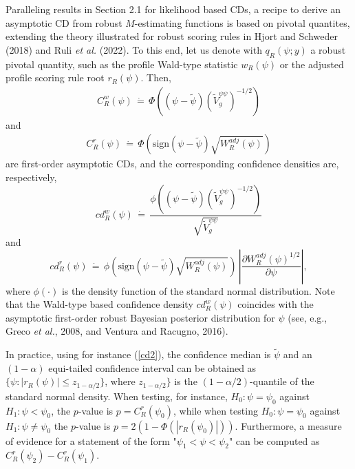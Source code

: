 \documentclass[preprint,12pt,authoryear]{elsarticle}
\begin{document}
Paralleling results in Section 2.1 for likelihood based CDs, a recipe to derive an asymptotic CD from robust $M$-estimating functions is based on pivotal quantites, extending the theory illustrated for robust scoring rules in Hjort and Schweder (2018) and Ruli {\em et al.} (2022). To this end, let us denote with $q_R (\psi;y)$ a robust pivotal quantity, such as the profile Wald-type statistic $w_{R}  (\psi)$ or the adjusted profile scoring rule root $r_{R} (\psi)$. Then, 
\begin{eqnarray}
C_{R}^w(\psi) \, \dot{=} \, \Phi\left( (\psi - \tilde\psi) (\tilde{V}_g^{\psi \psi})^{-1/2} \right)
\label{cd1}
\end{eqnarray}
and
\begin{eqnarray}
C_{R}^r(\psi) \, \dot{=} \, \Phi \left( \text{sign} (\psi - \tilde\psi) \sqrt{ W_{R}^{adj} (\psi) } \right)
\label{cd2}
\end{eqnarray}
are first-order asymptotic CDs, and the corresponding confidence densities are, respectively,
$$
cd_{R}^w(\psi) \, \dot{=} \, \frac{\phi \left((\psi - \tilde\psi) (\tilde{V}_g^{\psi \psi})^{-1/2} \right)}{\sqrt{\tilde{V}_g^{\psi \psi}}}
$$
and
$$
cd_{R}^r(\psi)  \, \dot{=} \,  \phi \left( \text{sign} (\psi - \tilde\psi) \sqrt{ W_{R}^{adj} (\psi) } \right) \,  \left| \frac{\partial W_{R}^{adj} (\psi)^{1/2}}{\partial \psi} \right|,
$$
where $\phi(\cdot)$ is the density function of the standard normal distribution. Note that the Wald-type based confidence density $cd_{R}^w(\psi) $ coincides with the asymptotic first-order robust Bayesian posterior distribution for $\psi$ (see, e.g., Greco {\em et al.}, 2008, and Ventura and Racugno, 2016).

In practice, using for instance (\ref{cd2}), the confidence median is $\tilde\psi$ and an $(1-\alpha)$ equi-tailed confidence interval can be obtained as $\{\psi : |r_{R} (\psi)| \leq z_{1-\alpha/2} \}$, where $z_{1-\alpha/2} \}$ is the $(1-\alpha/2)$-quantile of the standard normal density. When testing, for instance, $H_0: \psi = \psi_0$ against $H_1: \psi < \psi_0$, the $p$-value is $p=C_{R}^r(\psi_0)$, while when testing
 $H_0: \psi = \psi_0$ against $H_1: \psi \neq \psi_0$ the $p$-value is $p = 2(1-\Phi(|r_{R}(\psi_0)|))$. Furthermore, a measure of evidence for a statement of the form "$\psi_1<\psi<\psi_2$" can be computed as $C_{R}^r(\psi_2)-C_{R}^r(\psi_1)$.
 
\end{document}
